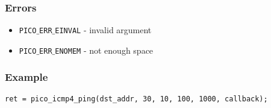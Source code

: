 \subsubsection*{Errors}
\begin{itemize}[noitemsep]
\item \texttt{PICO$\_$ERR$\_$EINVAL} - invalid argument
\item \texttt{PICO$\_$ERR$\_$ENOMEM} - not enough space
\end{itemize}

\subsubsection*{Example}
\begin{verbatim}
ret = pico_icmp4_ping(dst_addr, 30, 10, 100, 1000, callback);
\end{verbatim}


